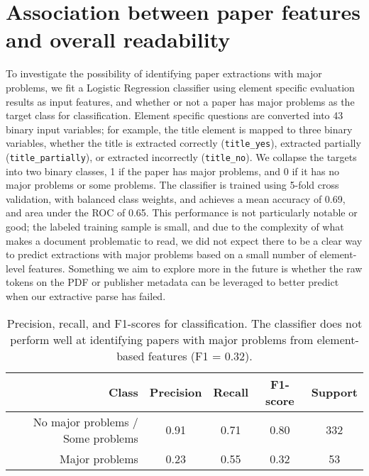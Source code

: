 \section{Association between paper features and overall readability}
\label{app:eval_association}

To investigate the possibility of identifying paper extractions with major problems, we fit a Logistic Regression classifier using element specific evaluation results as input features, and whether or not a paper has major problems as the target class for classification. Element specific questions are converted into 43 binary input variables;
for example, the title element is mapped to three binary variables, whether the title is extracted correctly (\texttt{title\_yes}), extracted partially (\texttt{title\_partially}), or extracted incorrectly (\texttt{title\_no}). We collapse the targets into two binary classes, 1 if the paper has major problems, and 0 if it has no major problems or some problems. The classifier is trained using 5-fold cross validation, with balanced class weights, and achieves a mean accuracy of 0.69, and area under the ROC of 0.65. This performance is not particularly notable or good; the labeled training sample is small, and due to the complexity of what makes a document problematic to read, we did not expect there to be a clear way to predict extractions with major problems based on a small number of element-level features. Something we aim to explore more in the future is whether the raw tokens on the PDF or publisher metadata can be leveraged to better predict when our extractive parse has failed.

\begin{table}[h!]
    \centering
    \begin{tabular}{r|ccc|c}
        \toprule
        Class & Precision & Recall & F1-score & Support \\
        \midrule
        No major problems / Some problems & 0.91 & 0.71 & 0.80 & 332 \\
        Major problems & 0.23 & 0.55 & 0.32 & 53 \\
        \bottomrule
    \end{tabular}
    \caption{Precision, recall, and F1-scores for classification. The classifier does not perform well at identifying papers with major problems from element-based features (F1 = 0.32).}
    \label{tab:logreg_majorproblems}
\end{table}

